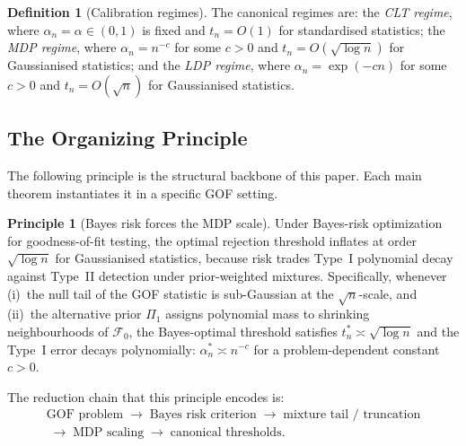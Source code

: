 \documentclass[11pt]{article}
\newcommand{\calF}{\mathcal{F}}
\newcommand{\1}{\mathbf{1}}
\theoremstyle{plain}
\theoremstyle{definition}
\newtheorem{definition}[theorem]{Definition}
\newtheorem{principle}[theorem]{Principle}
\theoremstyle{remark}
\begin{document}
\begin{definition}[Calibration regimes]\label{def:regimes}
The canonical regimes are:
the \emph{CLT regime}, where $\alpha_n=\alpha\in(0,1)$ is fixed and $t_n=O(1)$ for standardised statistics;
the \emph{MDP regime}, where $\alpha_n=n^{-c}$ for some $c>0$ and $t_n=O(\sqrt{\log n})$ for Gaussianised statistics; and
the \emph{LDP regime}, where $\alpha_n=\exp(-cn)$ for some $c>0$ and $t_n=O(\sqrt{n})$ for Gaussianised statistics.
\end{definition}


\subsection{The Organizing Principle}\label{subsec:principle}

The following principle is the structural backbone of this paper. Each main theorem instantiates it in a specific GOF setting.

%
\begin{mdframed}[style=principleframe]
\begin{principle}[Bayes risk forces the MDP scale]\label{princ:mdp}
Under Bayes-risk optimization for goodness-of-fit testing, the optimal rejection threshold inflates at order $\sqrt{\log n}$ for Gaussianised statistics, because risk trades Type~I polynomial decay against Type~II detection under prior-weighted mixtures.
Specifically, whenever
(i)~the null tail of the GOF statistic is sub-Gaussian at the $\sqrt{n}$-scale, and
(ii)~the alternative prior $\Pi_1$ assigns polynomial mass to shrinking neighbourhoods of $\calF_0$,
the Bayes-optimal threshold satisfies $t_n^*\asymp \sqrt{\log n}$ and the Type~I error decays polynomially: $\alpha_n^* \asymp n^{-c}$ for a problem-dependent constant $c>0$.
\end{principle}
\end{mdframed}

\medskip

The reduction chain that this principle encodes is:
\begin{multline*}
\text{GOF problem}
\;\rightarrow\;
\text{Bayes risk criterion}
\;\rightarrow\;
\text{mixture tail / truncation}\\
\;\rightarrow\;
\text{MDP scaling}
\;\rightarrow\;
\text{canonical thresholds}.
\end{multline*}
\end{document}
